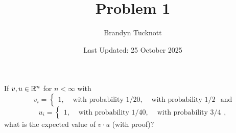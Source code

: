 \documentclass{exam}
\title{Problem 1}
\author{Brandyn Tucknott}
\date{Last Updated: 25 October 2025}
\begin{document}
\maketitle

\begin{questions}
    \question If $v, u\in\mathbb {R}^n$ for $n < \infty$ with
    $$v_i = \begin{cases}
        1, & \text{ with probability 1/2}
        0, & \text{ with probability 1/2}
    \end{cases} \text{ and}$$
    $$u_i = \begin{cases}
        1, & \text{ with probability 1/4}
        0, & \text{ with probability 3/4}
    \end{cases},$$
    what is the expected value of $v\cdot u$ (with proof)?
\end{questions}
\end{document}
